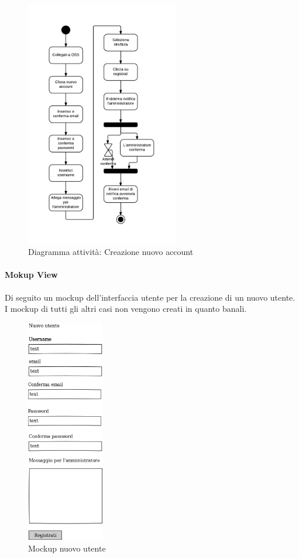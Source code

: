 \begin{figure}[H]
\centering
\includegraphics[width=0.6\textwidth]{images/user_new_user.png}
\caption{Diagramma attività: Creazione nuovo account}
\end{figure}


\paragraph{Mokup View}
Di seguito un mockup dell'interfaccia utente per la creazione di un nuovo utente.
I mockup di tutti gli altri casi non vengono creati in quanto banali.
\begin{figure}[H]
\centering
\includegraphics[width=0.3\textwidth]{images/mockup_nuovo_utente.png}
\caption{Mockup nuovo utente}
\end{figure}


